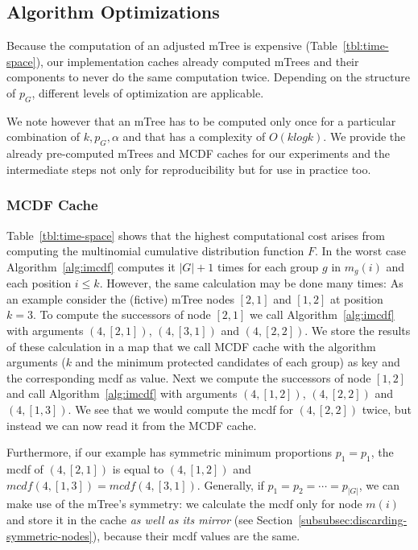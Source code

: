 \subsection{Algorithm Optimizations}
\label{subsec:algorithm-optimization}


Because the computation of an adjusted mTree is expensive (Table~\ref{tbl:time-space}), our implementation caches already computed mTrees and their components to never do the same computation twice.
%
Depending on the structure of $p_G$, different levels of optimization are applicable.

We note however that an mTree has to be computed only once for a particular combination of $k, p_G, \alpha$ and that \algoFAIR has a complexity of $O(k log k)$.
%
We provide the already pre-computed mTrees and MCDF caches for our experiments and the intermediate steps not only for reproducibility but for use in practice too.

\subsubsection{MCDF Cache}\label{subsubsec:mcdf-cache}
Table~\ref{tbl:time-space} shows that the highest computational cost arises from computing the multinomial cumulative distribution function $F$.
%
In the worst case Algorithm~\ref{alg:imcdf} computes it $|G|+1$ times for each group $g$ in $m_g(i)$ and each position $i\leq k$.
%
However, the same calculation may be done many times:
%
As an example consider the (fictive) mTree nodes $[2,1]$ and $[1,2]$ at position $k=3$.
%
To compute the successors of node $[2,1]$ we call Algorithm~\ref{alg:imcdf} with arguments $(4,[2,1])$, $(4,[3,1])$ and $(4,[2,2])$.
%
We store the results of these calculation in a map that we call MCDF cache with the algorithm arguments ($k$ and the minimum protected candidates of each group) as key and the corresponding mcdf as value.
%
Next we compute the successors of node $[1,2]$ and call Algorithm~\ref{alg:imcdf} with arguments $(4,[1,2])$, $(4,[2,2])$ and $(4,[1,3])$.
%
We see that we would compute the mcdf for $(4,[2,2])$ twice, but instead we can now read it from the MCDF cache.

Furthermore, if our example has symmetric minimum proportions $p_1 = p_1$, the mcdf of $(4,[2,1])$ is equal to $(4,[1,2])$ and $\textit{mcdf}(4,[1,3]) = \textit{mcdf}(4,[3,1])$.
%
Generally, if $p_1 = p_2 = \cdots = p_{|G|}$, we can make use of the mTree's symmetry: we calculate the mcdf only for node $m(i)$ and store it in the cache \emph{as well as its mirror} (see Section~\ref{subsubsec:discarding-symmetric-nodes}), because their mcdf values are the same.

